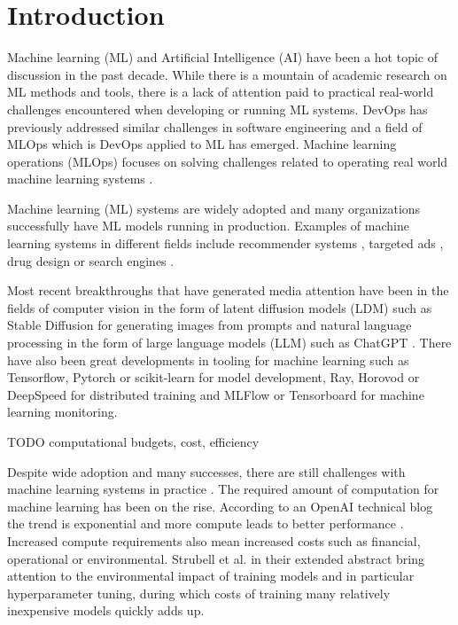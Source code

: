 \chapter{Introduction}
\label{chap:intro}


Machine learning (ML) and Artificial Intelligence (AI) have been a hot topic of discussion in the past decade. While there is a mountain of academic research on ML methods and tools, there is a lack of attention paid to practical real-world challenges encountered when developing or running ML systems. DevOps has previously addressed similar challenges in software engineering and a field of MLOps which is DevOps applied to ML has emerged. Machine learning operations (MLOps) focuses on solving challenges related to operating real world machine learning systems \parencite{kreuzbergerMachineLearningOperations2023}.

Machine learning (ML) systems are widely adopted and many organizations successfully have ML models running in production.
Examples of machine learning systems in different fields include recommender systems , targeted ads \parencite{domingosFewUsefulThings2012}, drug design \parencite{domingosFewUsefulThings2012} or search engines \parencite{domingosFewUsefulThings2012}.

Most recent breakthroughs that have generated media attention have been in the fields of computer vision in the form of latent diffusion models (LDM) \parencite{rombachHighResolutionImageSynthesis2022} such as Stable Diffusion \parencite{stabilityaiStableDiffusionPublic2022} for generating images from prompts and natural language processing in the form of large language models (LLM) \parencite{touvronLLaMAOpenEfficient2023} such as ChatGPT \parencite{openaiIntroducingChatGPT2022}. There have also been great developments in tooling for machine learning such as Tensorflow, Pytorch or scikit-learn  for model development, Ray, Horovod or DeepSpeed  for distributed training and MLFlow or Tensorboard  for machine learning monitoring.


TODO computational budgets, cost, efficiency

Despite wide adoption and many successes, there are still challenges with machine learning systems in practice . The required amount of computation for machine learning has been on the rise. According to an OpenAI technical blog the trend is exponential and more compute leads to better performance \parencite{amodeiAICompute2018}. Increased compute requirements also mean increased costs such as financial, operational or environmental. Strubell et al. \parencite*{strubellEnergyPolicyConsiderations2020} in their extended abstract bring attention to the environmental impact of training models and in particular hyperparameter tuning, during which costs of training many relatively inexpensive models quickly adds up.

